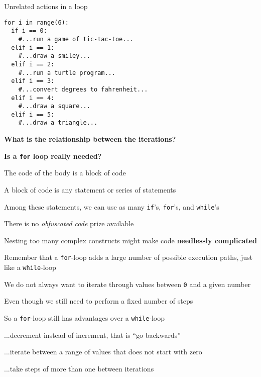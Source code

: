 \documentclass{beamer}
\begin{document}
\begin{frame}[fragile]{Unrelated actions in a loop}
\begin{lstlisting}
for i in range(6):
  if i == 0:
    #...run a game of tic-tac-toe...
  elif i == 1:
    #...draw a smiley...
  elif i == 2:
    #...run a turtle program...
  elif i == 3:
    #...convert degrees to fahrenheit...
  elif i == 4:
    #...draw a square...
  elif i == 5:
    #...draw a triangle...
\end{lstlisting}

\textbf{What is the relationship between the iterations?}

\textbf{Is a \texttt{for} loop really needed?}
\end{frame}

\begin{slide}{
\item The code of the body is a block of code
\item A block of code is any statement or series of statements
\item Among these statements, we can use as many \texttt{if}'s, \texttt{for}'s, and \texttt{while}'s
}\end{slide}

\begin{slide}{
\item There is no \textit{obfuscated code} prize available
\item Nesting too many complex constructs might make code \textbf{needlessly complicated}
\item Remember that a \texttt{for}-loop adds a large number of possible execution paths, just like a \texttt{while}-loop
}\end{slide}

\begin{slide}{
\item We do not always want to iterate through values between \texttt{0} and a given number
\item Even though we still need to perform a fixed number of steps
\item So a \texttt{for}-loop still has advantages over a \texttt{while}-loop
}\end{slide}

\begin{slide}{
\item ...decrement instead of increment, that is ``go backwards''
\item ...iterate between a range of values that does not start with zero
\item ...take steps of more than one between iterations
}\end{slide}
\end{document}
